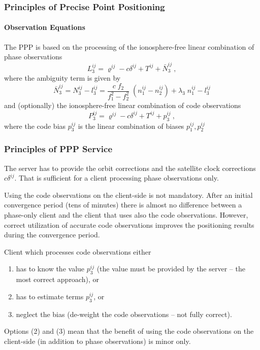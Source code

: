 \documentclass[10pt]{beamer}
\newcommand{\be}{\begin{equation}}
\newcommand{\ee}{\end{equation}}
\begin{document}

\begin{frame}
\frametitle{Principles of Precise Point Positioning}
\framesubtitle{Observation Equations}

The PPP is based on the processing of the ionosphere-free linear combination of phase
observations
\be
L^{ij}_3 = \varrho^{ij} - c\delta^{ij} + T^{ij} + \bar{N}^{ij}_3 ~,
\ee 
where the ambiguity term is given by
\be
\bar{N}^{ij}_3 =  N^{ij}_3 - l^{ij}_3 
              = \frac{c\;f_2}{f^2_1-f^2_2}\;(n^{ij}_1-n^{ij}_2) + \lambda_3\;n^{ij}_1 - l^{ij}_3 
\ee
and (optionally) the ionosphere-free linear combination of code observations
\be
P^{ij}_3 = \varrho^{ij} - c\delta^{ij} + T^{ij} + p^{ij}_3 ~,
\ee
where the code bias $p^{ij}_3$ is the linear combination of biases
$p^{ij}_1,p^{ij}_2$
\end{frame}


\begin{frame}
\frametitle{Principles of PPP Service}

The server has to provide the orbit corrections and the satellite clock corrections
$c\delta^{ij}$. That is sufficient for a client processing phase observations only. 

Using the code observations on the client-side is not mandatory. After an initial convergence
period (tens of minutes) there is almost no difference between a phase-only client and the client
that uses also the code observations. However, correct utilization of accurate code observations
improves the positioning results during the convergence period.

Client which processes code observations either
\begin{enumerate}
\item has to know the value $p^{ij}_3$ (the value must be provided by the server -- the most
  correct approach), or
\item has to estimate terms $p^{ij}_3$, or
\item neglect the bias (de-weight the code observations -- not fully correct).
\end{enumerate}
Options (2) and (3) mean that the benefit of using the code observations on the client-side (in
addition to phase observations) is minor only. 

\end{frame}
\end{document}
